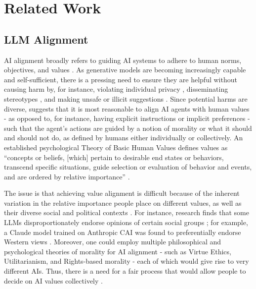 \section{Related Work}
\subsection{LLM Alignment}
AI alignment broadly refers to guiding AI systems to adhere to human norms, objectives, and values \cite{shen2024towards,ji2023ai}. As generative models are becoming increasingly capable and self-sufficient, there is a pressing need \cite{jobin2019global} to ensure they are helpful without causing harm by, for instance, violating individual privacy \cite{li2023privacy}, disseminating stereotypes \cite{abid2021persistent,hu2024}, and making unsafe or illicit suggestions \cite{ganguli2022red,deshpande2023toxicity,shevlane2023model}. Since potential harms are diverse, \citet{gabriel2020artificial} suggests that it is most reasonable to align AI agents with human values  - as opposed to, for instance, having explicit instructions or implicit preferences - such that the agent's actions are guided by a notion of morality or what it should and should not do, as defined by humans either individually or collectively. An established psychological  Theory of Basic Human Values defines values as ``concepts or beliefs, [which] pertain to desirable end states or 
behaviors, transcend specific situations, guide selection or evaluation of 
behavior and events, and are ordered by relative importance'' \cite{schwartz1992universals}. 

The issue is that achieving value alignment is difficult because of the inherent variation in the relative importance people place on different values, as well as their diverse social and political contexts \cite{kirk2024benefits,conitzer2024social,sorensen2024roadmap}. For instance, research finds that some LLMs disproportionately endorse opinions of certain social groups \cite{santurkar2023whose}; for example, a Claude model  trained on Anthropic CAI was found to preferentially endorse Western views \cite{durmus2023towards}. Moreover, one could employ multiple philosophical and psychological theories of morality for AI alignment - such as Virtue Ethics, Utilitarianism, and Rights-based morality - each of which would give rise to very different AIs. Thus, there is a need for a fair process that would allow people to decide on AI values collectively \cite{conitzer2024social}.

